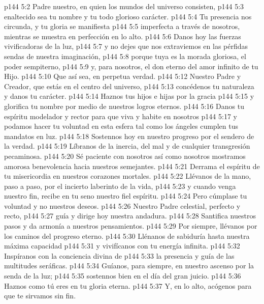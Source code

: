 \vsetoff
\vs p144 5:2 Padre nuestro, en quien los mundos del universo consisten,
\vs p144 5:3 \hsetoff enaltecido sea tu nombre y tu todo glorioso carácter.
\vs p144 5:4 Tu presencia nos circunda, y tu gloria se manifiesta
\vs p144 5:5 \hsetoff imperfecta a través de nosotros, mientras se muestra en perfección en lo alto.
\vs p144 5:6 Danos hoy las fuerzas vivificadoras de la luz,
\vs p144 5:7 \hsetoff y no dejes que nos extraviemos en las pérfidas sendas de nuestra imaginación,
\vs p144 5:8 porque tuya es la morada gloriosa, el poder sempiterno,
\vs p144 5:9 \hsetoff y, para nosotros, el don eterno del amor infinito de tu Hijo.
\vs p144 5:10 Que así sea, en perpetua verdad.
\separatorline
\vs p144 5:12 Nuestro Padre y Creador, que estás en el centro del universo,
\vs p144 5:13 \hsetoff concédenos tu naturaleza y danos tu carácter.
\vs p144 5:14 Haznos tus hijos e hijas por la gracia
\vs p144 5:15 \hsetoff y glorifica tu nombre por medio de nuestros logros eternos.
\vs p144 5:16 Danos tu espíritu modelador y rector para que viva y habite en nosotros
\vs p144 5:17 \hsetoff y podamos hacer tu voluntad en esta esfera tal como los ángeles cumplen tus mandatos en luz.
\vs p144 5:18 Sostennos hoy en nuestro progreso por el sendero de la verdad.
\vs p144 5:19 \hsetoff Líbranos de la inercia, del mal y de cualquier transgresión pecaminosa.
\vs p144 5:20 Sé paciente con nosotros así como nosotros mostramos amorosa benevolencia hacia nuestros semejantes.
\vs p144 5:21 \hsetoff Derrama el espíritu de tu misericordia en nuestros corazones mortales.
\vs p144 5:22 Llévanos de la mano, paso a paso, por el incierto laberinto de la vida,
\vs p144 5:23 \hsetoff y cuando venga nuestro fin, recibe en tu seno nuestro fiel espíritu.
\vs p144 5:24 Pero cúmplase tu voluntad y no nuestros deseos.
\separatorline
\vs p144 5:26 Nuestro Padre celestial, perfecto y recto,
\vs p144 5:27 \hsetoff guía y dirige hoy nuestra andadura.
\vs p144 5:28 Santifica nuestros pasos y da armonía a nuestros pensamientos.
\vs p144 5:29 \hsetoff Por siempre, llévanos por los caminos del progreso eterno.
\vs p144 5:30 Llénanos de sabiduría hasta nuestra máxima capacidad
\vs p144 5:31 \hsetoff y vivifícanos con tu energía infinita.
\vs p144 5:32 Inspíranos con la conciencia divina de
\vs p144 5:33 \hsetoff la presencia y guía de las multitudes seráficas.
\vs p144 5:34 Guíanos, para siempre, en nuestro ascenso por la senda de la luz;
\vs p144 5:35 \hsetoff sostennos bien en el día del gran juicio.
\vs p144 5:36 Haznos como tú eres en tu gloria eterna.
\vs p144 5:37 \hsetoff Y, en lo alto, acógenos para que te sirvamos sin fin.
